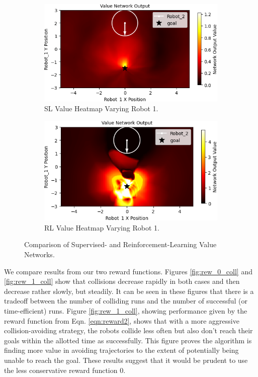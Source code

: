 \documentclass[conference]{IEEEtran}
\begin{document}
\begin{figure}[t]
    \centering
    \begin{subfigure}[b]{0.49\textwidth}
         \centering
         \includegraphics[width=\textwidth]{docs/latex/figures/heatmap_1_Robot_1.png}
         \caption{SL Value Heatmap Varying Robot 1.}
         \label{fig:heatmap_21}
     \end{subfigure}
     \hfill
     \begin{subfigure}[b]{0.49\textwidth}
         \centering
         \includegraphics[width=\textwidth]{docs/latex/figures/heatmap_rl_robot1.png}
         \caption{RL Value Heatmap Varying Robot 1.}
         \label{fig:heatmap_22}
     \end{subfigure}
     \caption{Comparison of Supervised- and Reinforcement-Learning Value Networks.}\label{fig:heatmap_2}
\end{figure}

We compare results from our two reward functions. Figures \ref{fig:rew_0_coll} and \ref{fig:rew_1_coll} show that collisions decrease rapidly in both cases and then decrease rather slowly, but steadily. It can be seen in these figures that there is a tradeoff between the number of colliding runs and the number of successful (or time-efficient) runs. Figure \ref{fig:rew_1_coll}, showing performance given by the reward function from Eqn. \ref{eqn:reward2}, shows that with a more aggressive collision-avoiding strategy, the robots collide less often but also don't reach their goals within the allotted time as successfully. This figure proves the algorithm is finding more value in avoiding trajectories to the extent of potentially being unable to reach the goal. These results suggest that it would be prudent to use the less conservative reward function 0.
\end{document}
